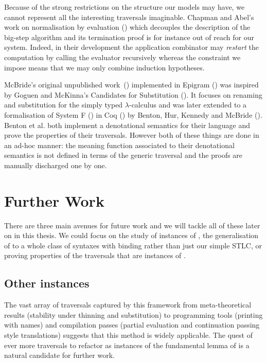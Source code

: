 Because of the strong restrictions on the structure our models may have,
we cannot represent all the interesting traversals imaginable. Chapman and
Abel's work on normalisation by evaluation
(\citeyear{chapman2009type,abel2014normalization})
which decouples the description of the big-step algorithm and its termination
proof is for instance out of reach for our system. Indeed, in their development
the application combinator may \emph{restart} the computation by calling the
evaluator recursively whereas the  constraint we impose means
that we may only combine induction hypotheses.

McBride's original unpublished work~(\citeyear{mcbride2005type}) implemented
in Epigram (\cite{mcbride2004view}) was inspired by Goguen and McKinna's
Candidates for Substitution (\citeyear{goguen1997candidates}). It focuses on
renaming and substitution for the simply typed $λ$-calculus and was later
extended to a formalisation of System F (\cite{girard1972interpretation})
in Coq (\cite{Coq:manual}) by Benton, Hur, Kennedy and McBride
(\citeyear{benton2012strongly}).
Benton et al. both implement a denotational semantics for their language
and prove the properties of their traversals. However both of these things
are done in an ad-hoc manner: the meaning function associated to their
denotational semantics is not defined in terms of the generic traversal
and the proofs are manually discharged one by one.

\section{Further Work}

There are three main avenues for future work and we will tackle all of these
later on in this thesis. We could focus on the study of instances of ,
the generalisation of  to a whole class of syntaxes with binding
rather than just our simple STLC, or proving properties of the traversals that
are instances of .

\subsection{Other instances}

The vast array of traversals captured by this framework from meta-theoretical
results (stability under thinning and substitution) to programming tools
(printing with names) and compilation passes (partial evaluation and
continuation passing style translations) suggests that this method is widely
applicable. The quest of ever more traversals to refactor as instances of the
fundamental lemma of  is a natural candidate for further work.

